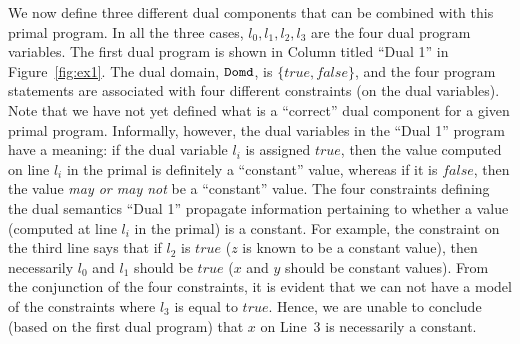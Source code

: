 \documentclass[preprint]{sig-alternate-05-2015}
\def\domd{{\tt{Domd}}}
\def\true{{\mathit{true}}}
\def\false{{\mathit{false}}}
\begin{document}
We now define three different dual components that can be combined
with this primal program.
In all the three cases, $l_0,l_1,l_2,l_3$ are the four dual program variables.
The first dual program is shown in Column titled ``Dual 1'' in 
Figure~\ref{fig:ex1}.
The dual domain, $\domd$, is $\{\true,\false\}$, and the four
program statements are associated with four different constraints
(on the dual variables).
Note that we have not yet defined what is a ``correct'' dual component
for a given primal program.  Informally, however, the
dual variables in the ``Dual 1'' program have a meaning:
if the dual variable $l_i$
is assigned $\true$, then the value computed on line $l_i$ in the primal
is definitely a ``constant'' value, whereas if it is $\false$,
then the value {\em{may or may not}} be a ``constant'' value.
The four constraints defining the dual semantics ``Dual 1'' 
propagate information pertaining
to whether a value (computed at line $l_i$ in the primal) is a
constant.
For example, the constraint on the third line says that
if $l_2$ is $\true$ ($z$ is known to be a constant value), then
necessarily $l_0$ and $l_1$ should be $\true$ ($x$ and $y$ should be constant
values).
From the conjunction of the four constraints, it is evident that 
we can not have a model of the constraints where $l_3$ is
equal to $\true$. Hence, we are unable to conclude (based on the
first dual program) that $x$ on Line~3
is necessarily a constant.
\end{document}
